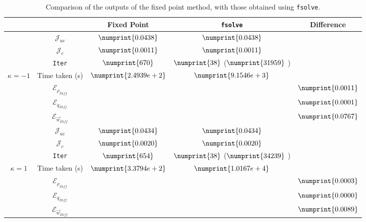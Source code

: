 \documentclass[11pt, a4paper]{article}
\theoremstyle{definition}
\newcommand{\adj}{q}
\begin{document}
\begin{table}
	\begin{tabular}{ | c | c || c | c | c ||}
		\hline
		\multicolumn{2}{|c||}{} & Fixed Point & \texttt{fsolve} & Difference   \\
		\hline
		\hline
		& $\mathcal{J}_{uc}$ & $\numprint{0.0438}$ & $\numprint{0.0438}$ &   \\
		& $\mathcal{J}_{c}$ & $\numprint{0.0011}$ & $\numprint{0.0011}$ &   \\
		& \texttt{Iter} & $\numprint{670}$ & $\numprint{38}$ ($\numprint{31959}$ )  &   \\
		$\kappa =-1$ & Time taken (s) & $\numprint{2.4939e+2}$ & $\numprint{9.1546e+3}$ &   \\
		& $\mathcal{E}_{\rho_{Diff}}$ & & &$\numprint{0.0011}$  \\
		& $\mathcal{E}_{\adj_{Diff}}$ & & &$\numprint{0.0001}$  \\
		& $\mathcal{E}_{\vec{w}_{Diff}}$ & & & $\numprint{0.0767}$  \\
		\hline
		& $\mathcal{J}_{uc}$ & $\numprint{0.0434}$ & $\numprint{0.0434}$ &   \\
		& $\mathcal{J}_{c}$ & $\numprint{0.0020}$ & $\numprint{0.0020}$ &   \\
		& \texttt{Iter} & $\numprint{654}$ & $\numprint{38}$ ($\numprint{34239}$ )  &   \\
		$\kappa =1$ & Time taken (s) & $\numprint{3.3794e+2}$ & $\numprint{1.0167e+4}$ &   \\
		& $\mathcal{E}_{\rho_{Diff}}$ & & &$\numprint{0.0003}$  \\
		& $\mathcal{E}_{\adj_{Diff}}$ & & &$\numprint{0.0000}$  \\
		& $\mathcal{E}_{\vec{w}_{Diff}}$ & & & $\numprint{0.0089}$  \\
		\hline
	\end{tabular}
	\caption{Comparison of the outputs of the fixed point method, with those obtained using \texttt{fsolve}.}
	\label{TabA3:Prob1}
\end{table}
\end{document}
